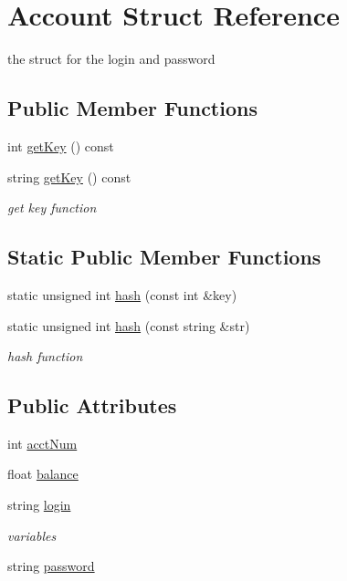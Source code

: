 \hypertarget{struct_account}{\section{Account Struct Reference}
\label{struct_account}
}


the struct for the login and password  


\subsection*{Public Member Functions}
\begin{DoxyCompactItemize}
\item 
int \hyperlink{struct_account_a799fdb1580f800ef7fba220c0dfa9ed9}{get\+Key} () const 
\item 
string \hyperlink{struct_account_a7601466b3831467ce6da9d16bc5822a8}{get\+Key} () const 
\begin{DoxyCompactList}\small\item\em get key function \end{DoxyCompactList}\end{DoxyCompactItemize}
\subsection*{Static Public Member Functions}
\begin{DoxyCompactItemize}
\item 
static unsigned int \hyperlink{struct_account_a05ec48bb7b69a8e39a2f66077fb5f0e5}{hash} (const int \&key)
\item 
static unsigned int \hyperlink{struct_account_ab23a7fb412fb96db126b8666c94b3d34}{hash} (const string \&str)
\begin{DoxyCompactList}\small\item\em hash function \end{DoxyCompactList}\end{DoxyCompactItemize}
\subsection*{Public Attributes}
\begin{DoxyCompactItemize}
\item 
int \hyperlink{struct_account_a28c251b009a021f846b5c1a612142c3a}{acct\+Num}
\item 
float \hyperlink{struct_account_a3acb87e14fe08776a714037637f248f7}{balance}
\item 
string \hyperlink{struct_account_a46db05c83141caf52a42d3d1426a8492}{login}
\begin{DoxyCompactList}\small\item\em variables \end{DoxyCompactList}\item 
string \hyperlink{struct_account_a7b92d220d2b749d91db2a39fc51ab0a2}{password}
\end{DoxyCompactItemize}


